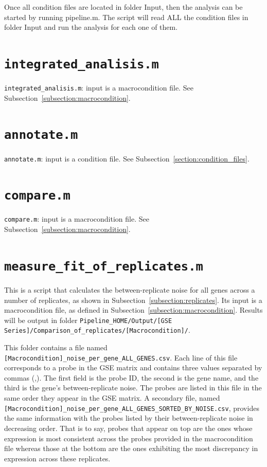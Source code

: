 \documentclass[final,letterpaper,twoside,12pt]{article}
\begin{document}
\fi

\par Once all condition files are located in folder Input, then the analysis can be started by running pipeline.m. The script will read ALL the condition files in folder Input and run the analysis for each one of them.

\section{\texttt{integrated\_analisis.m}}

\par \texttt{integrated\_analisis.m}: input is a macrocondition file. See Subsection~\ref{subsection:macrocondition}.

\section{\texttt{annotate.m}}

\par \texttt{annotate.m}: input is a condition file. See Subsection~\ref{section:condition_files}.

\section{\texttt{compare.m}}

\par \texttt{compare.m}: input is a macrocondition file. See Subsection~\ref{subsection:macrocondition}.

\section{\texttt{measure\_fit\_of\_replicates.m}}
\label{section:between_replicate_noise_m}

\par This is a script that calculates the between-replicate noise for all genes across a number of replicates, as shown in Subsection~\ref{subsection:replicates}. Its input is a macrocondition file, as defined in Subsection~\ref{subsection:macrocondition}. Results will be output in folder \texttt{Pipeline\_HOME/Output/[GSE Series]/Comparison\_of\_replicates/[Macrocondition]/}.

\par This folder contains a file named \texttt{[Macrocondition]\_noise\_per\_gene\_ALL\_GENES.csv}. Each line of this file corresponds to a probe in the GSE matrix and contains three values separated by commas (,). The first field is the probe ID, the second is the gene name, and the third is the gene's between-replicate noise. The probes are listed in this file in the same order they appear in the GSE matrix. A secondary file, named \texttt{[Macrocondition]\_noise\_per\_gene\_ALL\_GENES\_SORTED\_BY\_NOISE.csv}, provides the same information with the probes listed by their between-replicate noise in decreasing order. That is to say, probes that appear on top are the ones whose expression is most consistent across the probes provided in the macrocondition file whereas those at the bottom are the ones exhibiting the most discrepancy in expression across these replicates.



\end{document}
